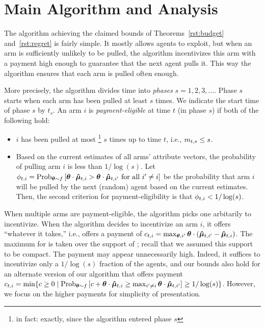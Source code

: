 \section{Main Algorithm and Analysis}
\label{sec:ub}
The algorithm achieving the claimed bounds of
Theorems~\ref{rst:budget} and~\ref{rst:regret} is fairly simple.
It mostly allows agents to exploit, but when an arm is sufficiently
unlikely to be pulled, 
the algorithm incentivizes this arm with a payment high enough
to guarantee that the next agent pulls it.
This way the algorithm ensures that each arm is pulled often enough.

More precisely, the algorithm divides time into \emph{phases}
$s = 1, 2, 3, \ldots$.
Phase $s$ starts when each arm has been pulled at least $s$ times.
We indicate the start time of phase $s$ by $t_s$. An arm $i$ is \emph{payment-eligible} at time $t$ (in phase $s$)
if both of the following hold:

\begin{itemize}
\item $i$ has been pulled at most%
\footnote{in fact: exactly, since the algorithm entered phase $s$}
$s$ times up to time $t$, i.e., $m_{t,s} \leq s$.
\item Based on the current estimates  of all arms'
attribute vectors, the probability of pulling arm $i$ is less than
$1/\log(s)$. Let $\PullProb{t}{i} = \Prob[\AgV \sim \AgentDist]{\AgV \cdot \ArmEV{t}{i} > \AgV
  \cdot \ArmEV{t}{i'} \mbox{ for all } i' \neq i}$
be the probability that arm $i$ will be pulled
by the next (random) agent based on the current estimates. 
Then, the second criterion for payment-eligibility is that
$\phi_{t,i} < 1/\log(s)$.
\end{itemize}

When multiple arms are payment-eligible, the algorithm picks one arbitarily to incentivize.
When the algorithm decides to incentivize an arm $i$,
it offers ``whatever it takes,'' i.e., offers a payment of
$c_{t,i} = \max_{\bm{\theta},i'} \bm{\theta} \cdot (\bm{\hat{\mu}}_{t,i'} - \bm{\hat{\mu}}_{t,i})$.
The maximum for \AgV is taken over the support of \AgentDist;
recall that we assumed this support to be compact.
The payment  may appear unnecessarily high.
Indeed, it suffices to
incentivize only a $1/\log(s)$ fraction of the agents,
and our bounds also hold for an alternate version of our algorithm that 
offers payment
$\Pay{t}{i} = \min \Set{c \geq 0}{%
\Prob[\AgV \sim \AgentDist]{c + \AgV \cdot \ArmEV{t}{i} \geq \max_{i'\ne i} \AgV \cdot \ArmEV{t}{i'}} \ge 1/\log(s)}$.
However, we focus on the higher payments for simplicity of presentation.

